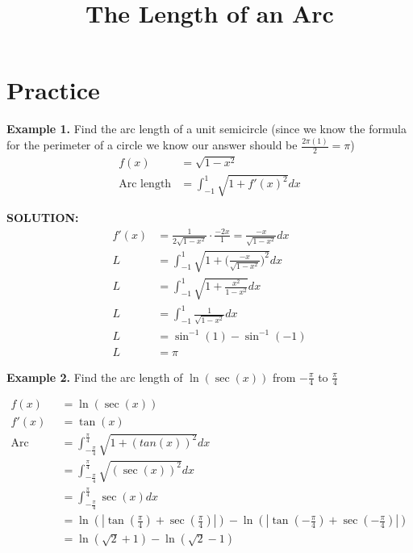 \documentclass[10pt]{extarticle}
\title{The Length of an Arc}
\makeatletter
\renewcommand{\maketitle}{
  \begin{center}
    {\Huge \@title}
    \vspace{0cm} %
  \end{center}
}
\makeatother
\begin{document}
\thispagestyle{empty}
\maketitle



\hrulefill


\section{Practice}
\textbf{Example 1.} Find the arc length of a unit semicircle (since we know the formula for the perimeter of a circle we know our answer should be $\frac{2\pi (1)}{2} = \pi$)
\begin{align}
    f(x) &= \sqrt{1-x^2} \\
    \text{Arc length} &= \int_{-1}^{1} \sqrt{1 + f'(x)^2} dx 
\end{align}

\begin{center}
\end{center}

\textbf{SOLUTION: }
\begin{align}
    f'(x) &= \frac{1}{2\sqrt{1-x^2}} \cdot \frac{-2x}{1} = \frac{-x}{\sqrt{1-x^2}} dx \\ 
    L &= \int_{-1}^{1} \sqrt{1 + ({\frac{-x}{\sqrt{1-x^2}})^2}} dx \\ 
    L &= \int_{-1}^{1} \sqrt{1 + \frac{x^2}{1-x^2}} dx \\
    L &= \int_{-1}^{1} \frac{1}{\sqrt{1-x^2}} dx \\ 
    L &= \sin^{-1}(1) - \sin^{-1}(-1) \\ 
    L &= \pi 
\end{align}

\textbf{Example 2.} Find the arc length of $\ln(\sec(x))$ from $-\frac{\pi}{4}$ to $\frac{\pi}{4}$

\begin{align}
    f(x) &= \ln(\sec(x)) \\ 
    f'(x) &= \tan(x) \\ 
   \text{Arc Length} &= \int_{-\frac{\pi}{4}}^{\frac{\pi}{4}}  \sqrt{1 + (tan(x))^2} dx \\ 
    &= \int_{-\frac{\pi}{4}}^{\frac{\pi}{4}}  \sqrt{(\sec(x))^2} dx \\
    &= \int_{-\frac{\pi}{4}}^{\frac{\pi}{4}}  \sec(x) dx \\
    &= \ln(|\tan(\frac{\pi}{4}) + \sec(\frac{\pi}{4})|) -  \ln(|\tan(-\frac{\pi}{4}) + \sec(-\frac{\pi}{4})|) \\
    &= \ln(\sqrt{2}+1) - \ln(\sqrt{2} - 1)
\end{align}
\end{document}
